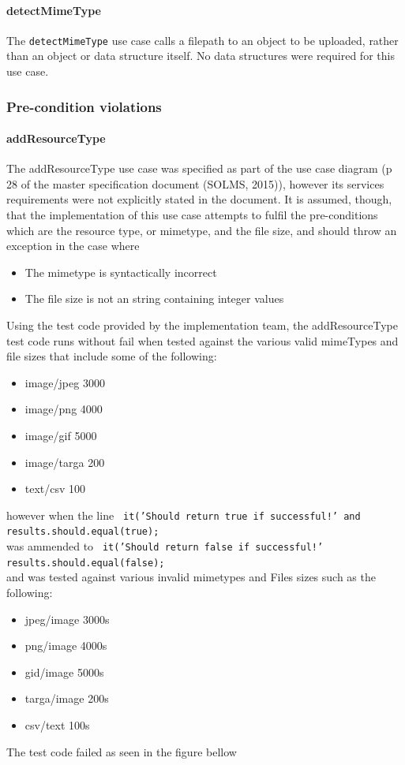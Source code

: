 \documentclass[a4paper]{article}
\begin{document}
\paragraph{detectMimeType}

The \texttt{detectMimeType} use case calls a filepath to an object to be uploaded, rather than an object or data structure itself. No data structures were required for this use case.


\subsubsection {Pre-condition violations}

\paragraph{addResourceType}The addResourceType use case was specified as part of the use case diagram (p 28 of the master specification document (SOLMS, 2015)), however its services requirements were not explicitly stated in the document. It is assumed, though, that the implementation of this use case attempts to fulfil the pre-conditions which are the resource type, or mimetype, and the file size, and should throw an exception in the case where
\begin{itemize}
\item The mimetype is syntactically incorrect
\item The file size is not an string containing integer values
\end{itemize}
Using the test code provided by the implementation team, the addResourceType test code runs without fail when tested against the various valid mimeTypes and file sizes that include some of the following:
\begin{itemize}
\item image/jpeg  3000
\item image/png   4000
\item image/gif   5000
\item image/targa 200
\item text/csv    100
\end{itemize}

however when the line \texttt{ it('Should return true if successful!' and  results.should.equal(true);}\\
was ammended to \texttt{ it('Should return false if successful!'  results.should.equal(false);}\\
and was tested against various invalid mimetypes and Files sizes such as the following:
\begin{itemize}
\item jpeg/image  3000s
\item png/image   4000s
\item gid/image   5000s
\item targa/image 200s
\item csv/text    100s
\end{itemize}
The test code failed as seen in the figure bellow
\end{document}
